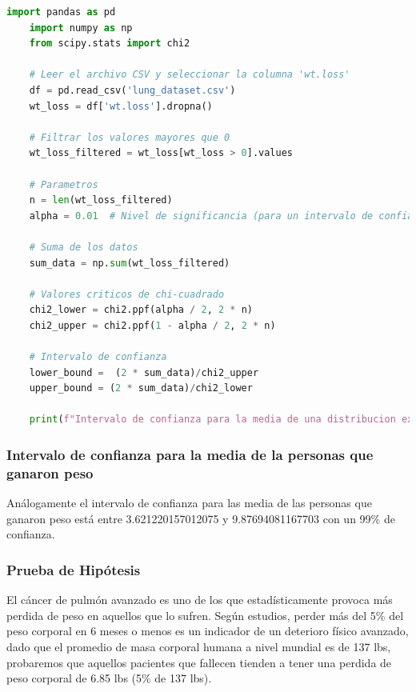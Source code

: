 \documentclass[a4paper,12pt]{article}
\begin{document}
\begin{lstlisting}[language=Python, caption={Código en Python para calcular el intervalo de confianza para la media de una distribución exponencial}, label={lst:intervalo_confianza_exponencial}]
    import pandas as pd
    import numpy as np
    from scipy.stats import chi2

    # Leer el archivo CSV y seleccionar la columna 'wt.loss'
    df = pd.read_csv('lung_dataset.csv')
    wt_loss = df['wt.loss'].dropna()

    # Filtrar los valores mayores que 0
    wt_loss_filtered = wt_loss[wt_loss > 0].values

    # Parametros
    n = len(wt_loss_filtered)
    alpha = 0.01  # Nivel de significancia (para un intervalo de confianza del 99%)

    # Suma de los datos
    sum_data = np.sum(wt_loss_filtered)

    # Valores criticos de chi-cuadrado
    chi2_lower = chi2.ppf(alpha / 2, 2 * n)
    chi2_upper = chi2.ppf(1 - alpha / 2, 2 * n)

    # Intervalo de confianza
    lower_bound =  (2 * sum_data)/chi2_upper 
    upper_bound = (2 * sum_data)/chi2_lower

    print(f"Intervalo de confianza para la media de una distribucion exponencial: ({lower_bound}, {upper_bound})")

\end{lstlisting}

\subsubsection*{Intervalo de confianza para la media de la personas que ganaron peso}

Análogamente el intervalo de confianza para las media de las personas que ganaron peso está entre 3.621220157012075 y 9.87694081167703 con un 99\% de confianza.

\subsubsection*{Prueba de Hipótesis}

El cáncer de pulmón avanzado es uno de los que estadísticamente provoca más perdida de peso en aquellos que lo sufren. Según estudios, perder más del 5\% del peso corporal en 6 meses o menos es un indicador de un deterioro físico avanzado, dado que el promedio de masa corporal humana a nivel mundial es de 137 lbs, probaremos que aquellos pacientes que fallecen tienden a tener una perdida de peso corporal de 6.85 lbs (5\% de 137 lbs).
\end{document}

